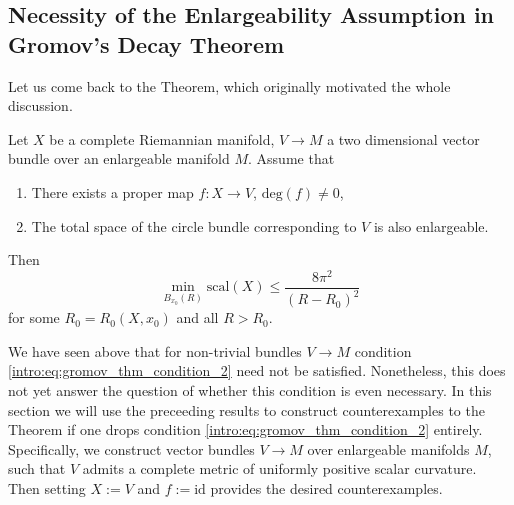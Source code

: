 \subsection{Necessity of the Enlargeability Assumption in Gromov's Decay Theorem}

Let us come back to the Theorem, which originally motivated the whole discussion. 

\begin{theorem*}
    \label{intro:thm:gromov_thm}
Let $X$ be a complete Riemannian manifold, $V \to M$ a two dimensional vector bundle over an enlargeable manifold $M$. Assume that 
\begin{enumerate}[label=(\roman*)]
    \item There exists a proper map $f \colon X \to V$, $\mathrm{deg}(f) \neq 0$,
    \item \label{intro:eq:gromov_thm_condition_2}The total space of the circle bundle corresponding to $V$ is also enlargeable.
\end{enumerate}
Then 
\[
\min_{B_{x_0}(R)} \mathrm{scal}(X) \leq \frac{8 \pi^2}{(R-R_0)^2}
\]
for some $R_0 = R_0(X,x_0)$ and all $R > R_0$.
\end{theorem*}

We have seen above that for non-trivial bundles $V \to M$ condition \ref{intro:eq:gromov_thm_condition_2} need not be satisfied. Nonetheless, this does not yet answer the question of whether this condition is even necessary. In this section we will use the preceeding results to construct counterexamples to the Theorem if one drops condition \ref{intro:eq:gromov_thm_condition_2} entirely. Specifically, we construct vector bundles $V \to M$ over enlargeable manifolds $M$, such that $V$ admits a complete metric of uniformly positive scalar curvature. Then setting $X := V$ and $f := \mathrm{id}$ provides the desired counterexamples.

